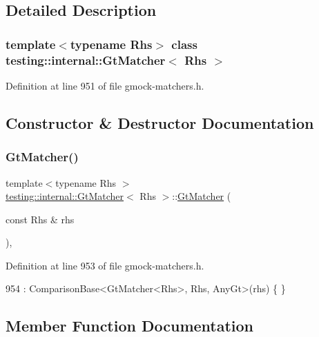 \subsection{Detailed Description}
\subsubsection*{template$<$typename Rhs$>$\newline
class testing\+::internal\+::\+Gt\+Matcher$<$ Rhs $>$}



Definition at line 951 of file gmock-\/matchers.\+h.



\subsection{Constructor \& Destructor Documentation}
\mbox{\label{classtesting_1_1internal_1_1GtMatcher_aeef0f6dd7c57a2ed0f379d8100de0215}} 
\subsubsection{\texorpdfstring{Gt\+Matcher()}{GtMatcher()}}
{\footnotesize\ttfamily template$<$typename Rhs $>$ \\
\hyperlink{classtesting_1_1internal_1_1GtMatcher}{testing\+::internal\+::\+Gt\+Matcher}$<$ Rhs $>$\+::\hyperlink{classtesting_1_1internal_1_1GtMatcher}{Gt\+Matcher} (\begin{DoxyParamCaption}\item[{const Rhs \&}]{rhs }\end{DoxyParamCaption})\hspace{0.3cm}{\ttfamily [inline]}, {\ttfamily [explicit]}}



Definition at line 953 of file gmock-\/matchers.\+h.


\begin{DoxyCode}
954       : ComparisonBase<GtMatcher<Rhs>, Rhs, AnyGt>(rhs) \{ \}
\end{DoxyCode}


\subsection{Member Function Documentation}
\mbox{\label{classtesting_1_1internal_1_1GtMatcher_ac4e664e328e4400e1cecc9b804de6937}} 
